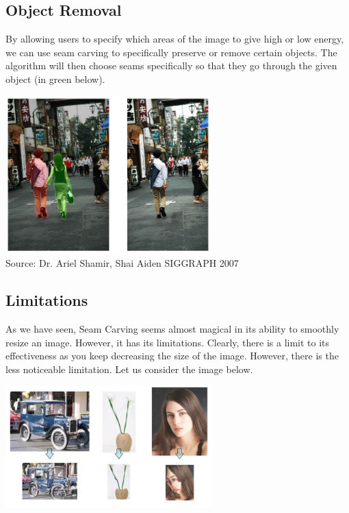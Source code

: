 \documentclass{article}
\begin{document}
\subsection{Object Removal}
By allowing users to specify which areas of the image to give high or low energy, we can use seam carving to specifically preserve or remove certain objects. The algorithm will then choose seams specifically so that they go through the given object (in green below).

\begin{center}
\includegraphics[width=8cm]{object_removal.JPG} \\
Source: Dr. Ariel Shamir, Shai Aiden SIGGRAPH 2007
\end{center}

\subsection{Limitations}
As we have seen, Seam Carving seems almost magical in its ability to smoothly resize an image. However, it has its limitations. Clearly, there is a limit to its effectiveness as you keep decreasing the size of the image. However, there is the less noticeable limitation. Let us consider the image below.
\begin{center}
\includegraphics[width=8cm]{seam_carving_limitations.JPG} \\
\end{center}
\end{document}

